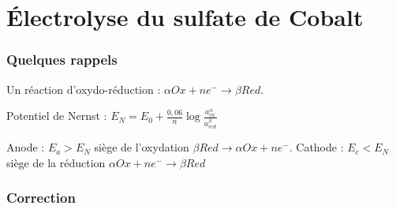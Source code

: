 \documentclass{report}
\begin{document}
\section*{Électrolyse du sulfate de Cobalt}

\subsubsection*{Quelques rappels}

Un réaction d'oxydo-réduction : $\alpha Ox + ne^-\longrightarrow \beta Red$.

Potentiel de Nernst : $E_N=E_0+\frac{0,06}{n}\log\frac{a_{ox}^\alpha}{a_{red}^\beta}$

Anode : $E_a>E_N$ siège de l'oxydation $\beta Red \longrightarrow \alpha Ox + ne^- $.
Cathode : $E_c<E_N$ siège de la réduction $\alpha Ox + ne^-\longrightarrow \beta Red$

\subsubsection*{Correction}
\end{document}
